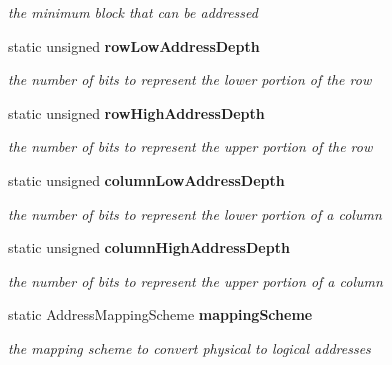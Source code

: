 \begin{CompactItemize}
\begin{CompactList}\small\item\em the minimum block that can be addressed \item\end{CompactList}\item 
static unsigned {\bf rowLowAddressDepth}\label{class_d_r_a_msim_i_i_1_1_address_3034d24b617b7fc397e55b95667e6d0d}

\begin{CompactList}\small\item\em the number of bits to represent the lower portion of the row \item\end{CompactList}\item 
static unsigned {\bf rowHighAddressDepth}\label{class_d_r_a_msim_i_i_1_1_address_3067a64b5977d9b1f375a6eda50c53e6}

\begin{CompactList}\small\item\em the number of bits to represent the upper portion of the row \item\end{CompactList}\item 
static unsigned {\bf columnLowAddressDepth}\label{class_d_r_a_msim_i_i_1_1_address_e80941c385a9b89fcd082bacb916b5a5}

\begin{CompactList}\small\item\em the number of bits to represent the lower portion of a column \item\end{CompactList}\item 
static unsigned {\bf columnHighAddressDepth}\label{class_d_r_a_msim_i_i_1_1_address_98ef042c63b6d22f81bc33823035cd94}

\begin{CompactList}\small\item\em the number of bits to represent the upper portion of a column \item\end{CompactList}\item 
static AddressMappingScheme {\bf mappingScheme}\label{class_d_r_a_msim_i_i_1_1_address_c996a58ebfce70dd74f48e52fc7ff386}

\begin{CompactList}\small\item\em the mapping scheme to convert physical to logical addresses \item\end{CompactList}\end{CompactItemize}


